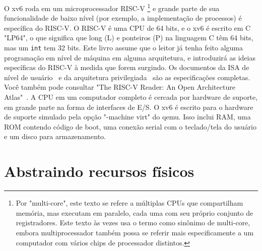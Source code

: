 O xv6 roda em um microprocessador RISC-V \footnote{ Por "multi-core", este texto se refere a múltiplas CPUs que compartilham memória, mas executam em paralelo, cada uma com seu próprio conjunto de registradores. Este texto às vezes usa o termo  como sinônimo de multi-core, embora multiprocessador também possa se referir mais especificamente a um computador com vários chips de processador distintos.} e grande parte de sua funcionalidade de baixo nível (por exemplo, a implementação de processos) é específica do RISC-V. O RISC-V é uma CPU de 64 bits, e o xv6 é escrito em C "LP64", o que significa que long (L) e ponteiros (P) na linguagem C têm 64 bits, mas um {\tt int} tem 32 bits. Este livro assume que o leitor já tenha feito alguma programação em nível de máquina em alguma arquitetura, e introduzirá as ideias específicas do RISC-V à medida que forem surgindo. Os documentos da ISA de nível de usuário~\cite{riscv:user} e da arquitetura privilegiada~\cite{riscv:priv} são as especificações completas. Você também pode consultar "The RISC-V Reader: An Open Architecture Atlas"~\cite{riscv}.
A CPU em um computador completo é cercada por hardware de suporte, em grande parte na forma de interfaces de E/S. O xv6 é escrito para o hardware de suporte simulado pela opção "-machine virt" do qemu. Isso inclui RAM, uma ROM contendo código de boot, uma conexão serial com o teclado/tela do usuário e um disco para armazenamento.

\section{Abstraindo recursos físicos} 

